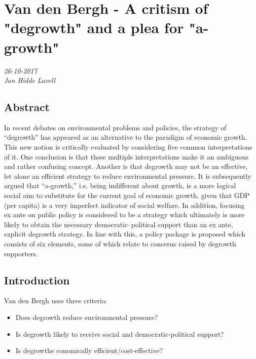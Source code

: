\chapter{Van den Bergh - A critism of "degrowth" and a plea for "a-growth"}
\textit{26-10-2017 \\
Jan Hidde Lavell} 

\section*{Abstract}
In recent debates on environmental problems and policies, the strategy of “degrowth” has appeared as an alternative to the paradigm of economic growth. This new notion is critically evaluated by considering five common interpretations of it. One conclusion is that these multiple interpretations make it an ambiguous and rather confusing concept. Another is that degrowth may not be an effective, let alone an efficient strategy to reduce environmental pressure. It is subsequently argued that “a-growth,” i.e. being indifferent about growth, is a more logical social aim to substitute for the current goal of economic growth, given that GDP (per capita) is a very imperfect indicator of social welfare. In addition, focusing ex ante on public policy is considered to be a strategy which ultimately is more likely to obtain the necessary democratic–political support than an ex ante, explicit degrowth strategy. In line with this, a policy package is proposed which consists of six elements, some of which relate to concerns raised by degrowth supporters.

\section*{Introduction}
Van den Bergh uses three criteria: 
\begin{itemize}
\item Does degrowth reduce environmental pressure?
\item Is degrowth likely to receive social and democratic-political support?
\item Is degrowthe conomically efficient/cost-effective?
\end{itemize}

